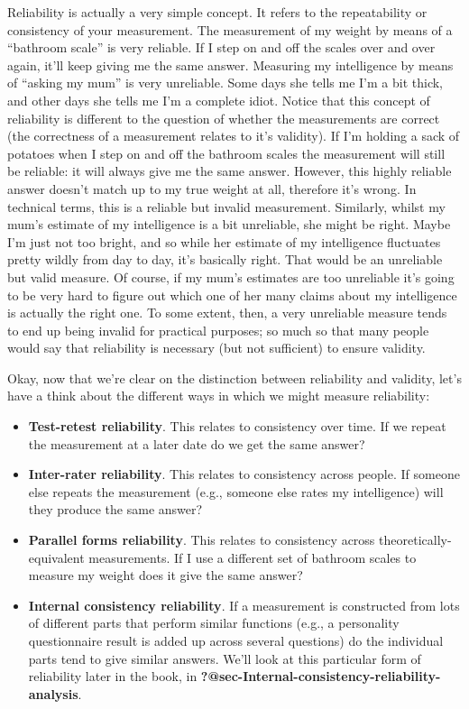\documentclass[
  a4paper,
]{book}
\providecommand{\tightlist}{%
  \setlength{\itemsep}{0pt}\setlength{\parskip}{0pt}}
\begin{document}
Reliability is actually a very simple concept. It refers to the
repeatability or consistency of your measurement. The measurement of my
weight by means of a ``bathroom scale'' is very reliable. If I step on
and off the scales over and over again, it'll keep giving me the same
answer. Measuring my intelligence by means of ``asking my mum'' is very
unreliable. Some days she tells me I'm a bit thick, and other days she
tells me I'm a complete idiot. Notice that this concept of reliability
is different to the question of whether the measurements are correct
(the correctness of a measurement relates to it's validity). If I'm
holding a sack of potatoes when I step on and off the bathroom scales
the measurement will still be reliable: it will always give me the same
answer. However, this highly reliable answer doesn't match up to my true
weight at all, therefore it's wrong. In technical terms, this is a
reliable but invalid measurement. Similarly, whilst my mum's estimate of
my intelligence is a bit unreliable, she might be right. Maybe I'm just
not too bright, and so while her estimate of my intelligence fluctuates
pretty wildly from day to day, it's basically right. That would be an
unreliable but valid measure. Of course, if my mum's estimates are too
unreliable it's going to be very hard to figure out which one of her
many claims about my intelligence is actually the right one. To some
extent, then, a very unreliable measure tends to end up being invalid
for practical purposes; so much so that many people would say that
reliability is necessary (but not sufficient) to ensure validity.

Okay, now that we're clear on the distinction between reliability and
validity, let's have a think about the different ways in which we might
measure reliability:

\begin{itemize}
\tightlist
\item
  \textbf{Test-retest reliability}. This relates to consistency over
  time. If we repeat the measurement at a later date do we get the same
  answer?
\item
  \textbf{Inter-rater reliability}. This relates to consistency across
  people. If someone else repeats the measurement (e.g., someone else
  rates my intelligence) will they produce the same answer?
\item
  \textbf{Parallel forms reliability}. This relates to consistency
  across theoretically-equivalent measurements. If I use a different set
  of bathroom scales to measure my weight does it give the same answer?
\item
  \textbf{Internal consistency reliability}. If a measurement is
  constructed from lots of different parts that perform similar
  functions (e.g., a personality questionnaire result is added up across
  several questions) do the individual parts tend to give similar
  answers. We'll look at this particular form of reliability later in
  the book, in \textbf{?@sec-Internal-consistency-reliability-analysis}.
\end{itemize}
\end{document}
